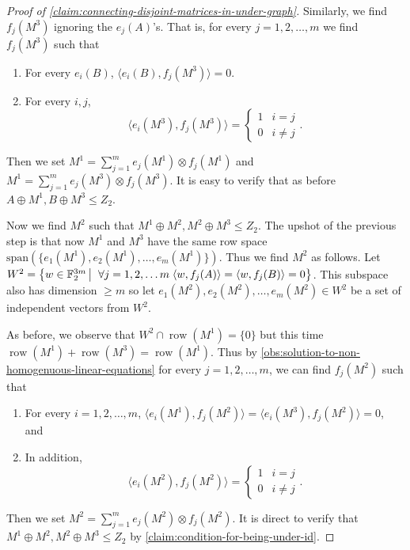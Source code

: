 \documentclass[10pt,a4paper]{article}
\newcommand{\prettyref}[1]{\cref{#1}}
\theoremstyle{definition}
\theoremstyle{remark}
\newcommand\sett[2]{\left\{ #1 \left| \; \vphantom{#1 #2} \right. #2  \right\}}
\newcommand{\set}[1]{\{#1\}}
\newcommand{\iprod}[1]{\langle#1\rangle}
\def\sp{\mathrm{ span}}
\newcommand{\F}{\mathbb{F}}
\DeclareMathOperator{\row}{row}
\renewcommand{\leq}{\leqslant}
\renewcommand{\geq}{\geqslant}
\numberwithin{equation}{section}
\let\pref=\prettyref
\begin{document}
\begin{proof}[Proof of \pref{claim:connecting-disjoint-matrices-in-under-graph}]
    Similarly, we find \(f_j(M^3)\) ignoring the \(e_j(A)\)'s. That is, for every \(j=1,2,\dots,m\) we find \(f_j(M^3)\) such that 
    \begin{enumerate}
        \item For every \(e_i(B)\), \(\iprod{e_i(B),f_j(M^3)}=0\).
        \item For every \(i,j\), \[\iprod{e_i(M^3),f_j(M^3)} = \begin{cases}
        1 & i=j \\ 0 & i \ne j
    \end{cases}.\]
    \end{enumerate}
    
    Then we set \(M^1 = \sum_{j=1}^{m} e_j(M^1) \otimes f_j(M^1)\) and \(M^1 = \sum_{j=1}^{m} e_j(M^3) \otimes f_j(M^3)\). It is easy to verify that as before \(A \oplus M^1, B \oplus M^3 \leq Z_2\).

    Now we find \(M^2\) such that \(M^1 \oplus M^2, M^2 \oplus M^3 \leq Z_2\). The upshot of the previous step is that now \(M^1\) and \(M^3\) have the same row space \(\sp(\set{e_1(M^1),e_2(M^1),\dots,e_{m}(M^1)})\). Thus we find \(M^2\) as follows. Let \(W^2 = \sett{w \in \F_2^{3m}}{\forall j=1,2,\dots m \; \iprod{w,f_j(A)}=\iprod{w,f_j(B)}=0}\). This subspace also has dimension \(\geq m\) so let \(e_1(M^2),e_2(M^2),\dots,e_{m}(M^2) \in W^2\) be a set of independent vectors from $W^2$.

    As before, we observe that \(W^2 \cap \row(M^1) = \set{0}\) but this time \(\row(M^1) + \row(M^3) = \row(M^1)\). Thus by \pref{obs:solution-to-non-homogenuous-linear-equations} for every \(j=1,2,\dots,m\), we can find \(f_j(M^2)\) such that 
    \begin{enumerate}
        \item For every \(i=1,2,\dots,m\), \(\iprod{e_i(M^1),f_j(M^2)}=\iprod{e_i(M^3),f_j(M^2)} = 0\), and
        \item In addition, \[\iprod{e_i(M^2),f_j(M^2)} = \begin{cases}
        1 & i=j \\ 0 & i \ne j
    \end{cases}.\]
    \end{enumerate}
    Then we set \(M^2 = \sum_{j=1}^{m} e_j(M^2) \otimes f_j(M^2)\). It is direct to verify that \(M^1 \oplus M^2, M^2 \oplus M^3 \leq Z_2\) by \pref{claim:condition-for-being-under-id}. 
\end{proof}
\end{document}
